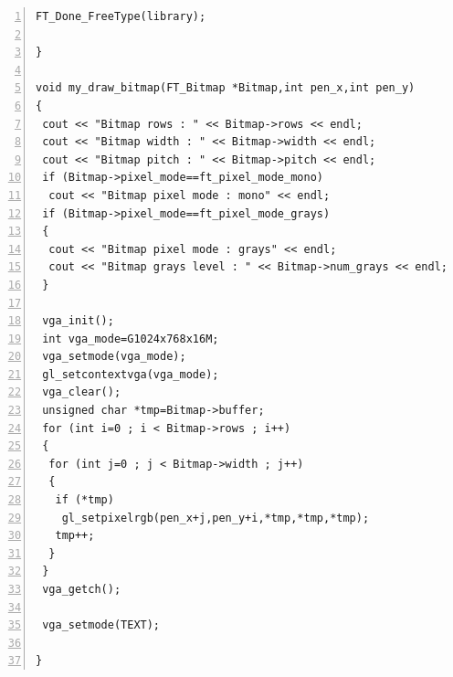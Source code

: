 \documentclass[12pt,a4]{article}
\begin{document}
\begin{CJK}{UTF8}{bsmi}
\begin{Verbatim}[commandchars=@\^?,numbers=left]
 FT_Done_FreeType(library);

}

void my_draw_bitmap(FT_Bitmap *Bitmap,int pen_x,int pen_y)
{
 cout << "Bitmap rows : " << Bitmap->rows << endl;
 cout << "Bitmap width : " << Bitmap->width << endl;
 cout << "Bitmap pitch : " << Bitmap->pitch << endl;
 if (Bitmap->pixel_mode==ft_pixel_mode_mono)
  cout << "Bitmap pixel mode : mono" << endl;
 if (Bitmap->pixel_mode==ft_pixel_mode_grays)
 {
  cout << "Bitmap pixel mode : grays" << endl;
  cout << "Bitmap grays level : " << Bitmap->num_grays << endl;
 }

 vga_init();
 int vga_mode=G1024x768x16M;
 vga_setmode(vga_mode);
 gl_setcontextvga(vga_mode);
 vga_clear();
 unsigned char *tmp=Bitmap->buffer;
 for (int i=0 ; i < Bitmap->rows ; i++)
 {
  for (int j=0 ; j < Bitmap->width ; j++)
  {
   if (*tmp)
    gl_setpixelrgb(pen_x+j,pen_y+i,*tmp,*tmp,*tmp);
   tmp++;
  }
 }
 vga_getch();

 vga_setmode(TEXT);

}
\end{Verbatim}

\end{CJK}
\end{document}
